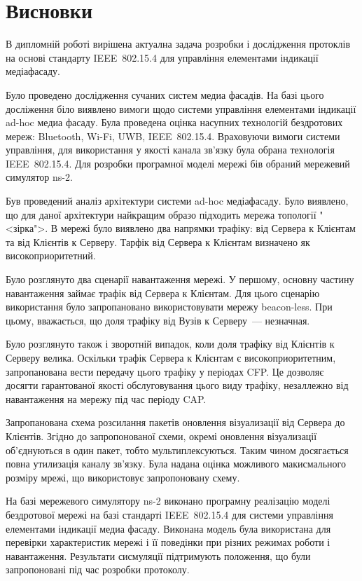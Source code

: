 \documentclass[a4paper,ukrainian,utf8,nocolumnsxix,floatsection,equationsection]{eskdtext}
\newcommand{\sectionnonum}[1]{\section*{#1}\addcontentsline{toc}{section}{#1}}
\newcommand{\iee}[0]{IEEE~802.15.4\xspace}
\newcommand{\blm}[0]{beacon-less\xspace}
\begin{document}
\sectionnonum{Висновки}

В дипломній роботі вирішена актуална задача розробки і дослідження протоклів на основі стандарту \iee для управління елементами індикації медіафасаду.

Було проведено дослідження сучаних систем медиа фасадів. На базі цього досліження біло виявлено вимоги щодо системи управління елементами індикації ad-hoc медиа фасаду. Була проведена оцінка насупних технологій бездротових мереж: Bluetooth, Wi-Fi, UWB, \iee. Враховуючи вимоги системи управління, для використання у якості канала зв’язку була обрана технологія \iee. Для розробки програмної моделі мережі бів обраний мережевий симулятор ns-2.

Був проведений аналіз архітектури системи ad-hoc медіафасаду. Було виявлено, що для даної архітектури найкращим образо підходить мережа топології "<зірка">. В мережі було виявлено два напрямки трафіку: від Сервера к Клієнтам та від Клієнтів к Серверу. Тарфік від Сервера к Клієнтам визначено як високоприоритетний.

Було розглянуто два сценарії навантаження мережі. У першому, основну частину навантаження займає трафік від Сервера к Клієнтам. Для цього сценарію використання було запропановано використовувати мережу \blm. При цьому, вважається, що доля трафіку від Вузів к Серверу~--- незначная.

Було розглянуто також і зворотній випадок, коли доля трафіку від Клієнтів к Серверу велика. Оскільки трафік Сервера к Клієнтам є високоприоритетним, запропанована вести передачу цього трафіку у періодах CFP. Це дозволяє досягти гарантованої якості обслуговування цього виду трафіку, незаллежно від навантаження на мережу під час періоду CAP.

Запропанована схема розсилання пакетів оновлення візуализації від Сервера до Клієнтів. Згідно до запропонованої схеми, окремі оновлення візуализації об’єднуються в один пакет, тобто мультиплексуються. Таким чином досягається повна утилизація каналу зв’язку. Була надана оцінка можливого макисмального розміру мрежі, що використовує запропоновану схему.

На базі мережевого симулятору ns-2 виконано програмну реалізацію моделі бездротової мережі на базі стандарті \iee для системи управління елементами індикації медиа фасаду. Виконана модель була використана для перевірки характеристик мережі і її поведінки при різних режимах роботи і навантаження. Результати сисмуляції підтримують положення, що були запропоновані під час розробки протоколу.



% 



\label{sec:app_a:script}
\end{document}
